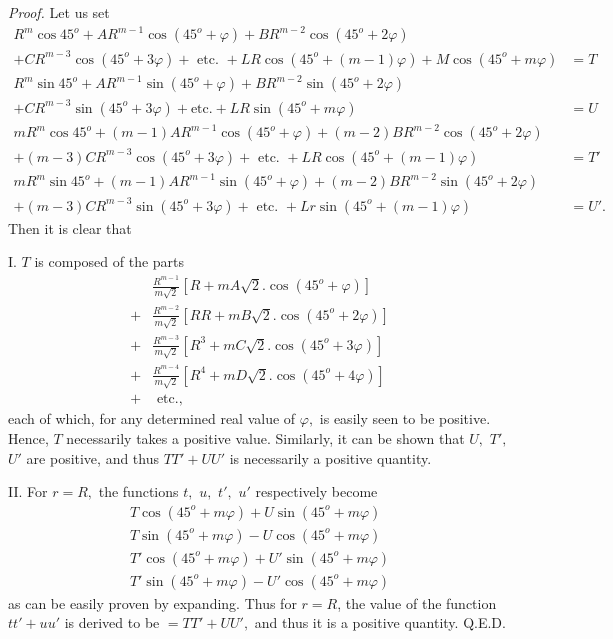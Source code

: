 \documentclass[12pt]{memoir}
\theoremstyle{plain}
\theoremstyle{remark}
\begin{document}
\textit{Proof.} Let us set
\begin{align*}
R^m\cos 45^o + A R^{m-1}\cos(45^o+\varphi)+BR^{m-2}\cos(45^o+2\varphi) &\\
+CR^{m-3}\cos(45^o+3\varphi)+\text{ etc. }+LR\cos(45^o+(m-1)\varphi)+M\cos(45^o+m\varphi) &= T\\
R^m\sin45^o+AR^{m-1}\sin(45^o+\varphi)+BR^{m-2}\sin(45^o+2\varphi)&\\
+CR^{m-3}\sin(45^o+3\varphi)+\text{etc.}+LR\sin(45^o+m\varphi)&= U \\
mR^m\cos 45^o +(m-1)AR^{m-1}\cos(45^o+\varphi)+(m-2)BR^{m-2}\cos(45^o+2\varphi)&\\
+(m-3)CR^{m-3}\cos(45^o+3\varphi)+\text{ etc. }+LR\cos(45^o+(m-1)\varphi) &= T'\\
mR^m\sin45^o +(m-1)AR^{m-1}\sin(45^o+\varphi) + (m-2)BR^{m-2}\sin(45^o+2\varphi)&\\
+(m-3)CR^{m-3}\sin(45^o+3\varphi)+\text{ etc. }+Lr\sin(45^o+(m-1)\varphi) &= U'.\end{align*}
Then it is clear that

I. \(T\) is composed of the parts
\begin{align*}
&\frac{R^{m-1}}{m\sqrt{2}}\left[R+mA\sqrt{2}.\cos(45^o+\varphi)\right]\\
+&\frac{R^{m-2}}{m\sqrt{2}}\left[RR+mB\sqrt{2}.\cos(45^o+2\varphi)\right]\\
+&\frac{R^{m-3}}{m\sqrt{2}}\left[R^3+mC\sqrt{2}.\cos(45^o+3\varphi)\right]\\
+&\frac{R^{m-4}}{m\sqrt{2}}\left[R^4+mD\sqrt{2}.\cos(45^o+4\varphi)\right]\\
+&\text{ etc.,} 
\end{align*}
each of which, for any determined real value of \(\varphi,\) is easily seen to be positive.  Hence, \(T\) necessarily takes a positive value. Similarly, it can be shown that \(U,\) \(T',\) \(U'\) are positive, and thus \(TT'+UU'\) is necessarily a positive quantity.

II. For \(r=R,\) the functions \(t,\) \(u,\) \(t',\) \(u'\) respectively become
\[\begin{array}{c}
T\cos(45^o+m\varphi)+U\sin(45^o+m\varphi)\\
T\sin(45^o+m\varphi)-U\cos(45^o+m\varphi)\\
T'\cos(45^o+m\varphi)+U'\sin(45^o+m\varphi)\\
T'\sin(45^o+m\varphi)-U'\cos(45^o+m\varphi)\end{array}\]
as can be easily proven by expanding. Thus for \(r=R\), the value of the function \(tt'+uu'\)  is derived to be \(=TT'+UU',\) and thus it is a positive quantity. Q.E.D.
\end{document}
